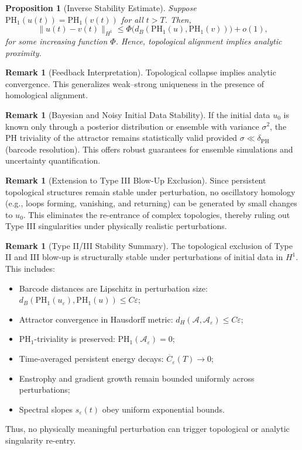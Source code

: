 \documentclass[11pt]{article}
\newtheorem{proposition}[theorem]{Proposition}
\theoremstyle{definition}
\newtheorem{remark}[theorem]{Remark}
\begin{document}
\begin{proposition}[Inverse Stability Estimate]
Suppose $\mathrm{PH}_1(u(t)) = \mathrm{PH}_1(v(t))$ for all $t > T$. Then,
\[
\|u(t) - v(t)\|_{H^1} \le \Phi\big(d_B(\mathrm{PH}_1(u), \mathrm{PH}_1(v))\big) + o(1),
\]
for some increasing function $\Phi$. Hence, topological alignment implies analytic proximity.
\end{proposition}

\begin{remark}[Feedback Interpretation]
Topological collapse implies analytic convergence. This generalizes weak--strong uniqueness in the presence of homological alignment.
\end{remark}

\begin{remark}[Bayesian and Noisy Initial Data Stability]
If the initial data $u_0$ is known only through a posterior distribution or ensemble with variance $\sigma^2$, the PH triviality of the attractor remains statistically valid provided $\sigma \ll \delta_{\mathrm{PH}}$ (barcode resolution). This offers robust guarantees for ensemble simulations and uncertainty quantification.
\end{remark}

\begin{remark}[Extension to Type III Blow-Up Exclusion]
Since persistent topological structures remain stable under perturbation, no oscillatory homology (e.g., loops forming, vanishing, and returning) can be generated by small changes to $u_0$. This eliminates the re-entrance of complex topologies, thereby ruling out Type III singularities under physically realistic perturbations.
\end{remark}

\begin{remark}[Type II/III Stability Summary]
The topological exclusion of Type II and III blow-up is structurally stable under perturbations of initial data in $H^1$. This includes:
\begin{itemize}
    \item Barcode distances are Lipschitz in perturbation size: $d_B(\mathrm{PH}_1(u_\varepsilon), \mathrm{PH}_1(u)) \le C \varepsilon$;
    \item Attractor convergence in Hausdorff metric: $d_H(\mathcal{A}, \mathcal{A}_\varepsilon) \le C \varepsilon$;
    \item PH$_1$-triviality is preserved: $\mathrm{PH}_1(\mathcal{A}_\varepsilon) = 0$;
    \item Time-averaged persistent energy decays: $\overline{C}_\varepsilon(T) \to 0$;
    \item Enstrophy and gradient growth remain bounded uniformly across perturbations;
    \item Spectral slopes $s_\varepsilon(t)$ obey uniform exponential bounds.
\end{itemize}
Thus, no physically meaningful perturbation can trigger topological or analytic singularity re-entry.
\end{remark}
\end{document}
